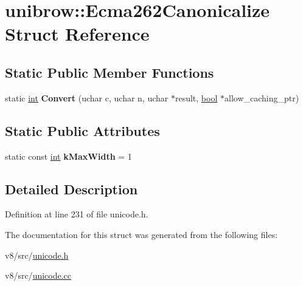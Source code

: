 \hypertarget{structunibrow_1_1Ecma262Canonicalize}{}\section{unibrow\+:\+:Ecma262\+Canonicalize Struct Reference}
\label{structunibrow_1_1Ecma262Canonicalize}
\subsection*{Static Public Member Functions}
\begin{DoxyCompactItemize}
\item 
\mbox{\label{structunibrow_1_1Ecma262Canonicalize_accc7f53059012c585aea3345818e1c8b}} 
static \mbox{\hyperlink{classint}{int}} {\bfseries Convert} (uchar c, uchar n, uchar $\ast$result, \mbox{\hyperlink{classbool}{bool}} $\ast$allow\+\_\+caching\+\_\+ptr)
\end{DoxyCompactItemize}
\subsection*{Static Public Attributes}
\begin{DoxyCompactItemize}
\item 
\mbox{\label{structunibrow_1_1Ecma262Canonicalize_a5df94ac0193e614eae5cef7ca74c2763}} 
static const \mbox{\hyperlink{classint}{int}} {\bfseries k\+Max\+Width} = 1
\end{DoxyCompactItemize}


\subsection{Detailed Description}


Definition at line 231 of file unicode.\+h.



The documentation for this struct was generated from the following files\+:\begin{DoxyCompactItemize}
\item 
v8/src/\mbox{\hyperlink{unicode_8h}{unicode.\+h}}\item 
v8/src/\mbox{\hyperlink{unicode_8cc}{unicode.\+cc}}\end{DoxyCompactItemize}
